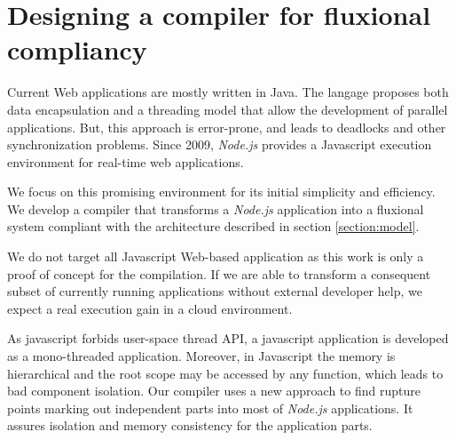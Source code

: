 \section{Designing a compiler for fluxional compliancy} \label{section:compiler}

Current Web applications are mostly written in Java.
The langage proposes both data encapsulation and a threading model that allow the development of parallel applications.
But, this approach is error-prone, and leads to deadlocks and other synchronization problems. 
Since 2009, \textit{Node.js}\cite{Dahl} provides a Javascript execution environment for real-time web applications.


We focus on this promising environment for its initial simplicity and efficiency.
We develop a compiler that transforms a \textit{Node.js} application into a fluxional system compliant with the architecture described in section \ref{section:model}.

We do not target all Javascript Web-based application as this work is only a proof of concept for the compilation.
If we are able to transform a consequent subset of currently running applications without external developer help, we expect a real execution gain in a cloud environment.


As javascript forbids user-space thread API, a javascript application is developed as a mono-threaded application.
Moreover, in Javascript  the memory is hierarchical and the root scope may be accessed by any function, which leads to bad component isolation.
Our compiler uses a new approach to find rupture points marking out independent parts into most of \textit{Node.js} applications.
It assures isolation and memory consistency for the application parts.



